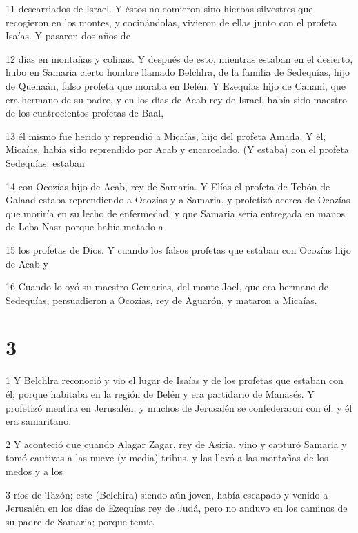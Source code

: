 \par 11 descarriados de Israel. Y éstos no comieron sino hierbas silvestres que recogieron en los montes, y cocinándolas, vivieron de ellas junto con el profeta Isaías. Y pasaron dos años de

\par 12 días en montañas y colinas. Y después de esto, mientras estaban en el desierto, hubo en Samaria cierto hombre llamado Belchlra, de la familia de Sedequías, hijo de Quenaán, falso profeta que moraba en Belén. Y Ezequías hijo de Canani, que era hermano de su padre, y en los días de Acab rey de Israel, había sido maestro de los cuatrocientos profetas de Baal,

\par 13 él mismo fue herido y reprendió a Micaías, hijo del profeta Amada. Y él, Micaías, había sido reprendido por Acab y encarcelado. (Y estaba) con el profeta Sedequías: estaban

\par 14 con Ocozías hijo de Acab, rey de Samaria. Y Elías el profeta de Tebón de Galaad estaba reprendiendo a Ocozías y a Samaria, y profetizó acerca de Ocozías que moriría en su lecho de enfermedad, y que Samaria sería entregada en manos de Leba Nasr porque había matado a

\par 15 los profetas de Dios. Y cuando los falsos profetas que estaban con Ocozías hijo de Acab y

\par 16 Cuando lo oyó su maestro Gemarias, del monte Joel, que era hermano de Sedequías, persuadieron a Ocozías, rey de Aguarón, y mataron a Micaías.

\chapter{3}

\par 1 Y Belchlra reconoció y vio el lugar de Isaías y de los profetas que estaban con él; porque habitaba en la región de Belén y era partidario de Manasés. Y profetizó mentira en Jerusalén, y muchos de Jerusalén se confederaron con él, y él era samaritano.

\par 2 Y aconteció que cuando Alagar Zagar, rey de Asiria, vino y capturó Samaria y tomó cautivas a las nueve (y media) tribus, y las llevó a las montañas de los medos y a los

\par 3 ríos de Tazón; este (Belchira) siendo aún joven, había escapado y venido a Jerusalén en los días de Ezequías rey de Judá, pero no anduvo en los caminos de su padre de Samaria; porque temía

